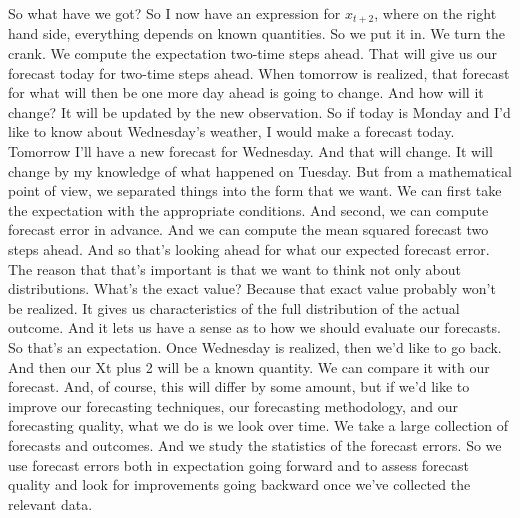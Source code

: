 \documentclass{article}
\begin{document}
So what have we got?
So I now have an expression for $x_{t+2}$, where on the right hand side,
everything depends on known quantities.
So we put it in.
We turn the crank.
We compute the expectation two-time steps ahead.
That will give us our forecast today for two-time steps ahead.
When tomorrow is realized, that forecast
for what will then be one more day ahead is going to change.
And how will it change?
It will be updated by the new observation.
So if today is Monday and I'd like
to know about Wednesday's weather,
I would make a forecast today.
Tomorrow I'll have a new forecast for Wednesday.
And that will change.
It will change by my knowledge of what happened on Tuesday.
But from a mathematical point of view,
we separated things into the form that we want.
We can first take the expectation
with the appropriate conditions.
And second, we can compute forecast error in advance.
And we can compute the mean squared forecast
two steps ahead.
And so that's looking ahead for what
our expected forecast error.
The reason that that's important is
that we want to think not only about distributions.
What's the exact value?
Because that exact value probably won't be realized.
It gives us characteristics of the full distribution
of the actual outcome.
And it lets us have a sense as to how we
should evaluate our forecasts.
So that's an expectation.
Once Wednesday is realized, then we'd like to go back.
And then our Xt plus 2 will be a known quantity.
We can compare it with our forecast.
And, of course, this will differ by some amount,
but if we'd like to improve our forecasting techniques,
our forecasting methodology, and our forecasting quality,
what we do is we look over time.
We take a large collection of forecasts and outcomes.
And we study the statistics of the forecast errors.
So we use forecast errors both in expectation going forward
and to assess forecast quality and look
for improvements going backward once we've
collected the relevant data.
	
\end{document}
